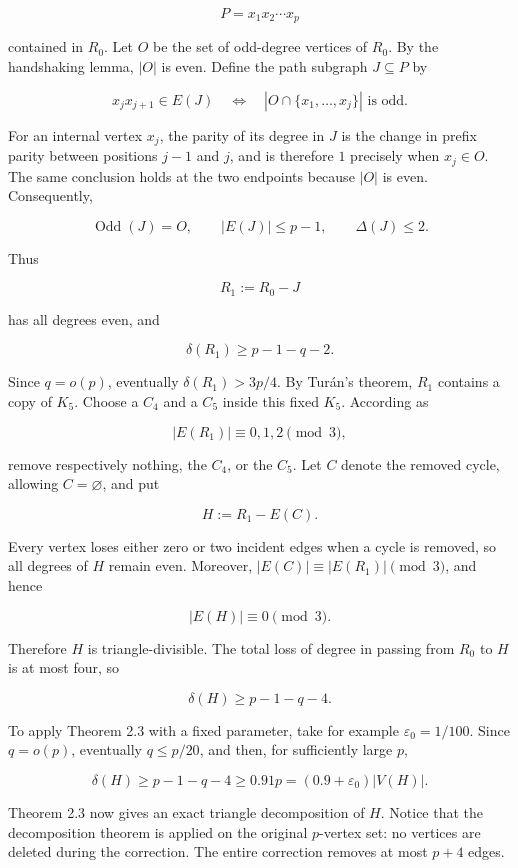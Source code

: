 \documentclass[english,11pt,a4paper]{article}
\begin{document}
\[
P=x_1x_2\cdots x_p
\]

contained in \(R_0\). Let \(O\) be the set of odd-degree vertices of
\(R_0\). By the handshaking lemma, \(|O|\) is even. Define the path
subgraph \(J\subseteq P\) by

\[
x_jx_{j+1}\in E(J)
\quad\Longleftrightarrow\quad
|O\cap\{x_1,\ldots,x_j\}|\text{ is odd}.
\tag{8.5}
\]

For an internal vertex \(x_j\), the parity of its degree in \(J\) is the
change in prefix parity between positions \(j-1\) and \(j\), and is
therefore \(1\) precisely when \(x_j\in O\). The same conclusion holds
at the two endpoints because \(|O|\) is even. Consequently,

\[
\operatorname{Odd}(J)=O,
\qquad
|E(J)|\le p-1,
\qquad
\Delta(J)\le2.
\tag{8.6}
\]

Thus

\[
R_1:=R_0-J
\]

has all degrees even, and

\[
\delta(R_1)\ge p-1-q-2.
\tag{8.7}
\]

Since \(q=o(p)\), eventually \(\delta(R_1)>3p/4\). By Turán's theorem,
\(R_1\) contains a copy of \(K_5\). Choose a \(C_4\) and a \(C_5\)
inside this fixed \(K_5\). According as

\[
|E(R_1)|\equiv0,1,2\pmod3,
\]

remove respectively nothing, the \(C_4\), or the \(C_5\). Let \(C\)
denote the removed cycle, allowing \(C=\varnothing\), and put

\[
H:=R_1-E(C).
\]

Every vertex loses either zero or two incident edges when a cycle is
removed, so all degrees of \(H\) remain even. Moreover,
\(|E(C)|\equiv |E(R_1)|\pmod3\), and hence

\[
|E(H)|\equiv0\pmod3.
\]

Therefore \(H\) is triangle-divisible. The total loss of degree in
passing from \(R_0\) to \(H\) is at most four, so

\[
\delta(H)\ge p-1-q-4.
\tag{8.8}
\]

To apply Theorem 2.3 with a fixed parameter, take for example
\(\varepsilon_0=1/100\). Since \(q=o(p)\), eventually \(q\le p/20\), and
then, for sufficiently large \(p\),

\[
\delta(H)\ge p-1-q-4\ge0.91p=(0.9+\varepsilon_0)|V(H)|.
\tag{8.9}
\]

Theorem 2.3 now gives an exact triangle decomposition of \(H\). Notice
that the decomposition theorem is applied on the original \(p\)-vertex
set: no vertices are deleted during the correction. The entire
correction removes at most \(p+4\) edges.
\end{document}
